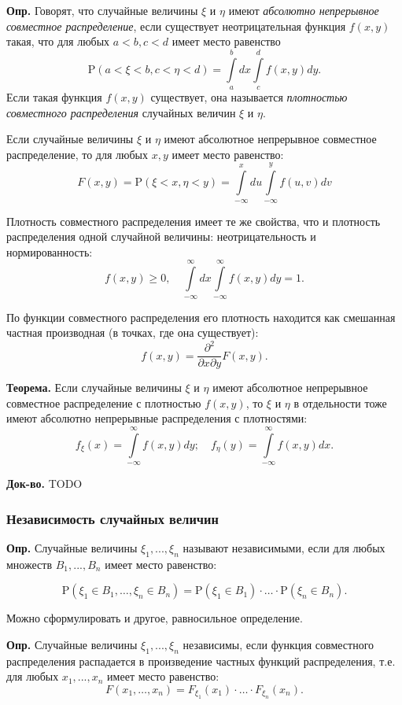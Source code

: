 \documentclass[oneside,final,14pt]{extreport}
\newcommand\mydef{{\bf Опр.}}
\newcommand\myth{{\bf Теорема.}}
\newcommand\myqed{{\bf Док-во.}}
\theoremstyle{definition}
\begin{document}
\mydef{} Говорят, что случайные величины $\xi$ и $\eta$ имеют {\it абсолютно непрерывное совместное распределение}, если существует неотрицательная функция $f(x,y)$ такая, что для любых $a < b, c < d$ имеет место равенство
$$\mathrm{P}(a<\xi<b, c<\eta<d)=\int\limits_{a}^{b} d x \int\limits_{c}^{d} f(x, y) d y.$$
Если такая функция $f(x,y)$ существует, она называется {\it плотностью совместного распределения} случайных величин $\xi$ и $\eta$.

Если случайные величины $\xi$ и $\eta$ имеют абсолютное непрерывное совместное распределение, то для любых $x, y$ имеет место равенство:
\begin{equation}F(x, y)=\mathrm{P}(\xi<x, \eta<y)=\int\limits_{-\infty}^{x} d u \int\limits_{-\infty}^{y} f(u, v) d v\end{equation}

Плотность совместного распределения имеет те же свойства, что и плотность распределения одной случайной величины: неотрицательность и нормированность:
$$f(x, y) \geqslant 0, \quad \int\limits_{-\infty}^{\infty} d x \int\limits_{-\infty}^{\infty} f(x, y) d y=1.$$

По функции совместного распределения его плотность находится как смешанная частная производная (в точках, где она существует):
$$f(x, y)=\frac{\partial^{2}}{\partial x \partial y} F(x, y).$$

\myth{} Если случайные величины $\xi$ и $\eta$ имеют абсолютное непрерывное совместное распределение с плотностью $f(x,y)$, то $\xi$ и $\eta$ в отдельности тоже имеют абсолютно непрерывные распределения с плотностями:
$$f_{\xi}(x)=\int\limits_{-\infty}^{\infty} f(x, y) d y ; \quad f_{\eta}(y)=\int\limits_{-\infty}^{\infty} f(x, y) d x.$$

\myqed{} TODO

\subsubsection{Независимость случайных величин}

\mydef{} Случайные величины $\xi_1, ..., \xi_n$ называют независимыми, если для любых множеств $B_1, ..., B_n$ имеет место равенство:

$$\mathrm{P}\left(\xi_{1} \in B_{1}, \ldots, \xi_{n} \in B_{n}\right)=\mathrm{P}\left(\xi_{1} \in B_{1}\right) \cdot \ldots \cdot \mathrm{P}\left(\xi_{n} \in B_{n}\right).$$

Можно сформулировать и другое, равносильное определение.

\mydef{} Случайные величины $\xi_1, ..., \xi_n$ независимы, если функция совместного распределения распадается в произведение частных функций распределения, т.е. для любых $x_1, ..., x_n$ имеет место равенство:
$$F\left(x_{1}, \ldots, x_{n}\right)=F_{\xi_{1}}\left(x_{1}\right) \cdot \ldots \cdot F_{\xi_{n}}\left(x_{n}\right).$$
\end{document}
